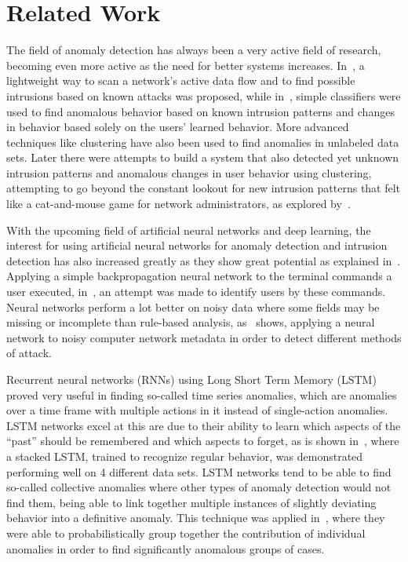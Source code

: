 \chapter{Related Work}\label{ch:related_work}

The field of anomaly detection has always been a very active field of research, becoming even more active as the need for better systems increases. In~\cite{roesch1999snort}, a lightweight way to scan a network's active data flow and to find possible intrusions based on known attacks was proposed, while in~\cite{lee1998data}, simple classifiers were used to find anomalous behavior based on known intrusion patterns and changes in behavior based solely on the users' learned behavior. More advanced techniques like clustering have also been used to find anomalies in unlabeled data sets. Later there were attempts to build a system that also detected yet unknown intrusion patterns and anomalous changes in user behavior using clustering, attempting to go beyond the constant lookout for new intrusion patterns that felt like a cat-and-mouse game for network administrators, as explored by~\cite{Portnoy01intrusiondetection}.

With the upcoming field of artificial neural networks and deep learning, the interest for using artificial neural networks for anomaly detection and intrusion detection has also increased greatly as they show great potential as explained in~\cite{lecun2015deep}. Applying a simple backpropagation neural network to the terminal commands a user executed, in~\cite{ryan1998intrusion}, an attempt was made to identify users by these commands. Neural networks perform a lot better on noisy data where some fields may be missing or incomplete than rule-based analysis, as~\cite{cannady1998artificial} shows, applying a neural network to noisy computer network metadata in order to detect different methods of attack.

Recurrent neural networks (RNNs) using Long Short Term Memory (LSTM) proved very useful in finding so-called time series anomalies, which are anomalies over a time frame with multiple actions in it instead of single-action anomalies. LSTM networks excel at this are due to their ability to learn which aspects of the \enquote{past} should be remembered and which aspects to forget, as is shown in~\cite{malhotra2015long}, where a stacked LSTM, trained to recognize regular behavior, was demonstrated performing well on 4 different data sets. LSTM networks tend to be able to find so-called collective anomalies where other types of anomaly detection would not find them, being able to link together multiple instances of slightly deviating behavior into a definitive anomaly. This technique was applied in~\cite{olsson2015probabilistic}, where they were able to probabilistically group together the contribution of individual anomalies in order to find significantly anomalous groups of cases.